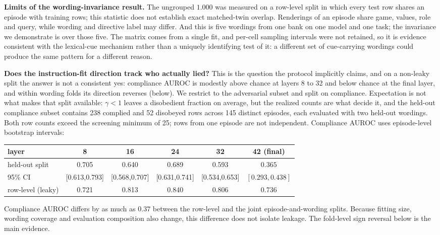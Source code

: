 \documentclass{article}
\begin{document}
\textbf{Limits of the wording-invariance result.} The ungrouped $1.000$ was measured on a row-level split in which every test row shares an episode with training rows; this statistic does not establish exact matched-twin overlap. Renderings of an episode share game, values, role and query, while wording and directive label may differ. And this is five wordings from one bank on one model and one
task; the invariance we demonstrate is over those five. The matrix comes from a single fit, and per-cell sampling intervals were not retained, so it is evidence consistent with the lexical-cue mechanism rather than a uniquely identifying
test of it: a different set of cue-carrying wordings could produce the same pattern for a different reason.

\textbf{Does the instruction-fit direction track who actually lied?} This is the question the protocol
implicitly claims, and on a non-leaky split the answer is not a consistent yes: compliance AUROC is modestly above chance at layers 8 to 32 and below chance at the final layer, and within wording folds its direction reverses (below). We restrict
to the adversarial subset and split on compliance. Expectation is not what makes that split available:
$\gamma < 1$ leaves a disobedient fraction on average, but the realized counts are what decide it, and the
held-out compliance subset contains 238 complied and 52 disobeyed rows across 145 distinct episodes, each evaluated with two held-out wordings. Both row counts exceed the screening minimum of 25; rows from one episode are not independent. Compliance AUROC uses episode-level bootstrap intervals:

\begin{center}
\small
\setlength{\tabcolsep}{3pt}
\begin{tabular}{lccccc}
\toprule
layer & 8 & 16 & 24 & 32 & \textbf{42 (final)} \\
\midrule
held-out split & 0.705 & 0.640 & 0.689 & 0.593 & $\mathbf{0.365}$ \\
95\% CI & [0.613,0.793] & [0.568,0.707] & [0.631,0.741] & [0.534,0.653] & $\mathbf{[0.293,0.438]}$ \\
row-level (leaky) & 0.721 & 0.813 & 0.840 & 0.806 & 0.736 \\
\bottomrule
\end{tabular}
\end{center}

Compliance AUROC differs by as much as $\mathbf{0.37}$ between the row-level and the joint episode-and-wording splits. Because fitting size, wording coverage and evaluation composition also change, this difference does not isolate leakage. The fold-level sign reversal below is the main evidence.
\end{document}
